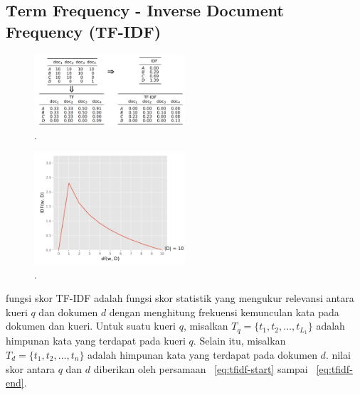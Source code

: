     \subsection{\f{Term Frequency - Inverse Document Frequency} (TF-IDF)}
    \label{sec:tfidf}

    \begin{figure}
        \centering
        \includegraphics[width=0.50\textwidth]{assets/pics/tf-idf-matriks.png}
        \caption{\license.}
        \label{fig:tf-idf-matriks}
    \end{figure}

    \begin{figure}
        \centering
        \includegraphics[width=0.50\textwidth]{assets/pics/idf-graph.png}
        \caption{\license.}
        \label{fig:idf-graph}
    \end{figure}

    fungsi skor TF-IDF adalah fungsi skor statistik yang mengukur relevansi antara kueri $q$ dan dokumen $d$ dengan menghitung frekuensi kemunculan kata pada dokumen dan kueri. Untuk suatu kueri $q$, misalkan $T_q= \{t_1, t_2, \dots, t_{L_1}\}$ adalah himpunan kata yang terdapat pada kueri $q$. Selain itu, misalkan $T_d = \{t_1, t_2, \dots, t_n\}$ adalah himpunan kata yang terdapat pada dokumen $d$. nilai skor antara $q$ dan $d$ diberikan oleh persamaan \equ~\ref{eq:tfidf-start} sampai \equ~\ref{eq:tfidf-end}.

